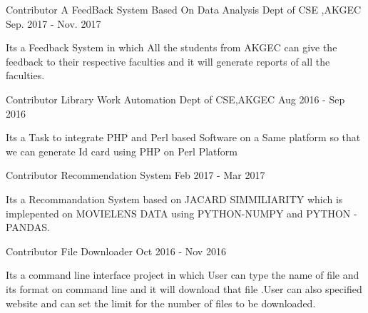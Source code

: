 

\begin{cventries}

  \cventry
    {Contributor} %
    {A FeedBack System Based On Data Analysis} %
    {Dept of CSE ,AKGEC} %
    {Sep. 2017 - Nov. 2017} %
    {
      \begin{cvitems} %
        \item {Its a Feedback System in which All the students from AKGEC can give the feedback to their respective faculties and it will generate reports of all the faculties.}
      \end{cvitems}
    }

  \cventry
    {Contributor} %
    {Library Work Automation} %
    {Dept of CSE,AKGEC} %
    {Aug 2016 - Sep 2016} %
    {
      \begin{cvitems} %
        \item { Its a Task to integrate PHP and Perl based Software on a Same platform so that we can generate Id card using PHP on Perl Platform}
      \end{cvitems}
    }
    
    
      \cventry
    {Contributor} %
    {Recommendation System  } %
    {} %
    {Feb 2017 - Mar 2017} %
    {
      \begin{cvitems} %
        \item {Its a Recommandation System based on JACARD SIMMILIARITY which is implepented on MOVIELENS DATA using PYTHON-NUMPY and PYTHON -PANDAS.}
      \end{cvitems}
    }
    
    

   \cventry
    {Contributor} %
    {File Downloader  } %
    {} %
    {Oct 2016 - Nov 2016} %
    {
      \begin{cvitems} %
        \item {Its a command line interface project in which User can type the name of file and its format on command line and it will download that file .User can also specified website and can set the limit for the number of files to be downloaded.}
      \end{cvitems}
    }


\end{cventries}
